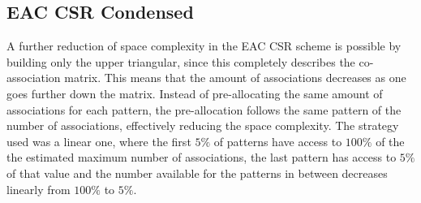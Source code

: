 
\subsection{EAC CSR Condensed}

A further reduction of space complexity in the EAC CSR scheme is possible by building only the upper triangular, since this completely describes the co-association matrix.
This means that the amount of associations decreases as one goes further down the matrix.
Instead of pre-allocating the same amount of associations for each pattern, the pre-allocation follows the same pattern of the number of associations, effectively reducing the space complexity.
The strategy used was a linear one, where the first $5\%$ of patterns have access to $100\%$ of the the estimated maximum number of associations, the last pattern has access to $5\%$ of that value and the number available for the patterns in between decreases linearly from $100\%$ to $5\%$.
